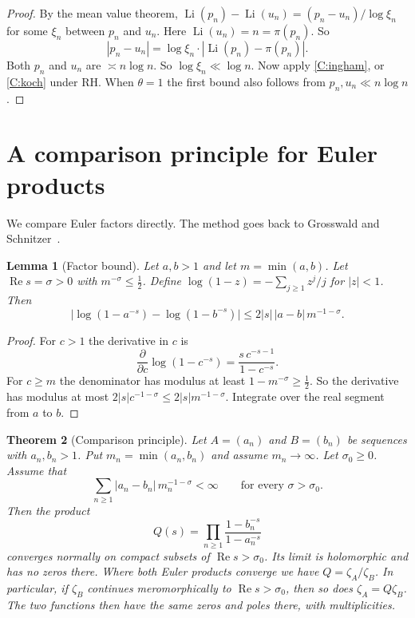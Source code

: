 \documentclass[12pt,letterpaper]{article}
\newtheorem{theorem}{Theorem}[section]
\newtheorem{lemma}[theorem]{Lemma}
\theoremstyle{definition}
\theoremstyle{remark}
\numberwithin{equation}{section}
\newcommand{\Li}{\operatorname{Li}}
\newcommand{\Ree}{\operatorname{Re}}
\begin{document}
\begin{proof}
By the mean value theorem,
$\Li(p_n)-\Li(u_n)=(p_n-u_n)/\log\xi_n$ for some $\xi_n$ between $p_n$
and $u_n$. Here $\Li(u_n)=n=\pi(p_n)$. So
\[
|p_n-u_n|=\log\xi_n\cdot|\Li(p_n)-\pi(p_n)|.
\]
Both $p_n$ and $u_n$ are $\asymp n\log n$. So $\log\xi_n\ll\log n$. Now
apply \ref{C:ingham}, or \ref{C:koch} under RH. When $\theta=1$ the first
bound also follows from $p_n,u_n\ll n\log n$.
\end{proof}

\section{A comparison principle for Euler products}\label{sec:comparison}

We compare Euler factors directly. The method goes back to Grosswald and
Schnitzer~\cite{GS78}.

\begin{lemma}[Factor bound]\label{lem:factor}
Let $a,b>1$ and let $m=\min(a,b)$. Let $\Ree s=\sigma>0$ with
$m^{-\sigma}\le\frac12$. Define $\log(1-z)=-\sum_{j\ge1}z^j/j$ for
$|z|<1$. Then
\[
\bigl|\log(1-a^{-s})-\log(1-b^{-s})\bigr|\le 2|s|\,|a-b|\,m^{-1-\sigma}.
\]
\end{lemma}

\begin{proof}
For $c>1$ the derivative in $c$ is
\[
\frac{\partial}{\partial c}\log(1-c^{-s})=\frac{s\,c^{-s-1}}{1-c^{-s}}.
\]
For $c\ge m$ the denominator has modulus at least $1-m^{-\sigma}\ge\frac12$.
So the derivative has modulus at most $2|s|c^{-1-\sigma}\le2|s|m^{-1-\sigma}$.
Integrate over the real segment from $a$ to $b$.
\end{proof}

\begin{theorem}[Comparison principle]\label{thm:comparison}
Let $A=(a_n)$ and $B=(b_n)$ be sequences with $a_n,b_n>1$. Put
$m_n=\min(a_n,b_n)$ and assume $m_n\to\infty$. Let $\sigma_0\ge0$. Assume
that
\begin{equation}\label{eq:l1}
\sum_{n\ge1}|a_n-b_n|\,m_n^{-1-\sigma}<\infty
\qquad\text{for every }\sigma>\sigma_0.
\end{equation}
Then the product
\[
Q(s)=\prod_{n\ge1}\frac{1-b_n^{-s}}{1-a_n^{-s}}
\]
converges normally on compact subsets of $\Ree s>\sigma_0$. Its limit is
holomorphic and has no zeros there. Where both Euler products converge we
have $Q=\zeta_A/\zeta_B$. In particular, if $\zeta_B$ continues
meromorphically to $\Ree s>\sigma_0$, then so does $\zeta_A=Q\zeta_B$. The
two functions then have the same zeros and poles there, with
multiplicities.
\end{theorem}
\end{document}
